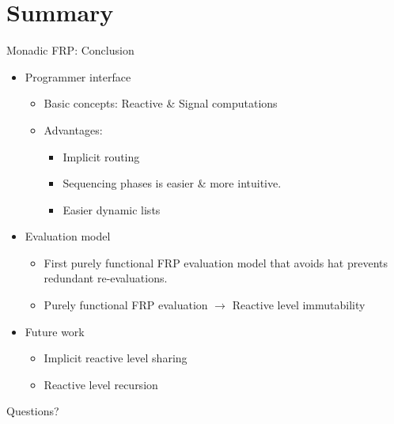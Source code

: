 \documentclass{beamer}
\begin{document}
\section{Summary}

\begin{frame}{Monadic FRP: Conclusion}
\begin{itemize}
\item Programmer interface
\begin{itemize}
\item Basic concepts: Reactive \& Signal computations
\item Advantages: \begin{itemize}
\item Implicit routing
\item Sequencing phases is easier \& more intuitive.
\item Easier dynamic lists 
\end{itemize}
\end{itemize}

\item Evaluation model
\begin{itemize} 
\item First purely functional FRP evaluation model that avoids hat prevents redundant re-evaluations.
\item Purely functional FRP evaluation $\rightarrow$ Reactive level immutability
\end{itemize}

\item Future work
\begin{itemize} 
\item Implicit reactive level sharing
\item Reactive level recursion
\end{itemize}
\end{itemize}
\pause
Questions?
\end{frame}
\end{document}
